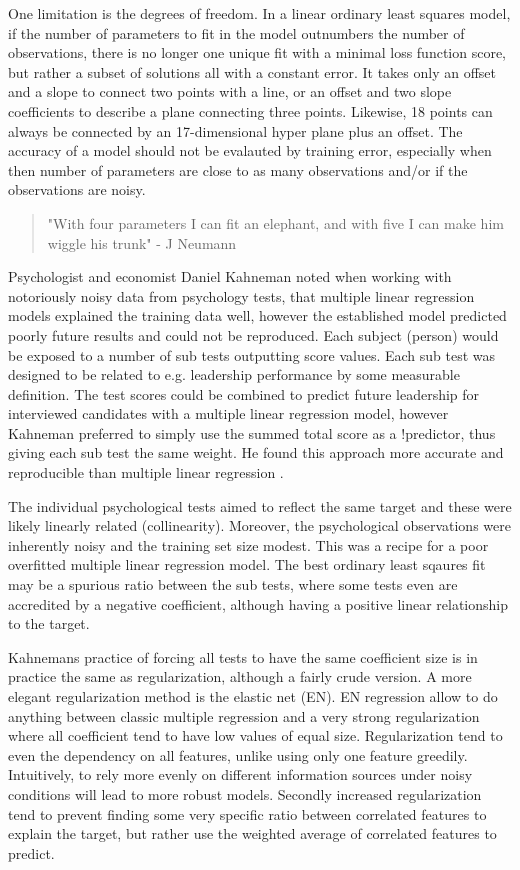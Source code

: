 One limitation is the degrees of freedom. In a linear ordinary least squares model, if the number of parameters to fit in the model outnumbers the number of observations, there is no longer one unique fit with a minimal loss function score, but rather a subset of solutions all with a constant error. It takes only an offset and a slope to connect two points with a line, or an offset and two slope coefficients to describe a plane connecting three points. Likewise, 18 points can always be connected by an 17-dimensional hyper plane plus an offset. The accuracy of a model should not be evalauted by training error, especially when then number of parameters are close to as many observations and/or if the observations are noisy.

\begin{quotation}
"With four parameters I can fit an elephant, and with five I can make him wiggle his trunk"  - J Neumann
\cite{wiki2016John}
\end{quotation}

Psychologist and economist Daniel Kahneman noted when working with notoriously noisy data from psychology tests, that multiple linear regression models explained the training data well, however the established model predicted poorly future results and could not be reproduced. Each subject (person) would be exposed to a number of sub tests outputting score values. Each sub test was designed to be related to e.g. leadership performance by some measurable definition. The test scores could be combined to predict future leadership for interviewed candidates with a multiple linear regression model, however Kahneman preferred to simply use the summed total score as a !predictor, thus giving each sub test the same weight. He found this approach more accurate and reproducible than multiple linear regression \cite{kahneman2011thinking}.

The individual psychological tests aimed to reflect the same target and these were likely linearly related (collinearity). Moreover, the psychological observations were inherently noisy and the training set size modest. This was a recipe for a poor overfitted multiple linear regression model. The best ordinary least sqaures fit may be a spurious ratio between the sub tests, where some tests even are accredited by a negative coefficient, although having a positive linear relationship to the target.

Kahnemans practice of forcing all tests to have the same coefficient size is in practice the same as regularization, although a fairly crude version. A more elegant regularization method is the elastic net (EN). EN regression allow to do anything between classic multiple regression and a very strong regularization where all coefficient tend to have low values of equal size. Regularization tend to even the dependency on all features, unlike using only one feature greedily. Intuitively, to rely more evenly on different information sources under noisy conditions will lead to more robust models. Secondly increased regularization tend to prevent finding some very specific ratio between correlated features to explain the target, but rather use the weighted average of correlated features to predict.

